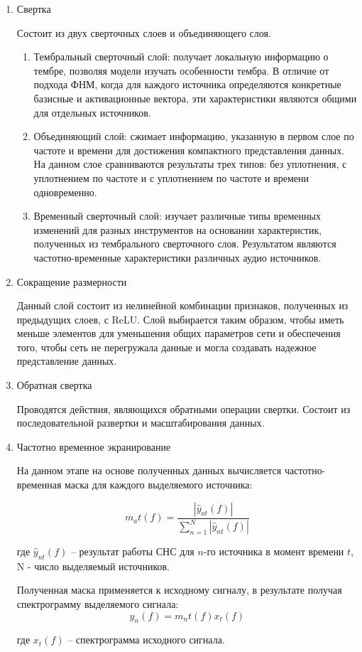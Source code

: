 \begin{enumerate}
	\item Свертка
	
	Состоит из двух сверточных слоев и объединяющего слоя. 
	\begin{enumerate}
		\item Тембральный сверточный слой: получает локальную информацию о тембре, позволяя модели изучать особенности тембра. В отличие от подхода ФНМ, когда для каждого источника определяются конкретные базисные и активационные вектора, эти характеристики являются общими для отдельных источников.
		\item Объединяющий слой: сжимает информацию, указанную в первом слое по частоте и времени для достижения компактного представления данных. На данном слое сравниваются результаты трех типов: без уплотнения, с уплотнением по частоте и с уплотнением по частоте и времени одновременно.
		\item Временный сверточный слой: изучает различные типы временных изменений для разных инструментов на основании характеристик, полученных из тембрального сверточного слоя. Результатом являются частотно-временные характеристики различных аудио источников. 
	\end{enumerate}
	
	\item Сокращение размерности
	
	Данный слой состоит из нелинейной комбинации признаков, полученных из предыдущих слоев, с ReLU. Слой выбирается таким образом, чтобы иметь меньше элементов для уменьшения общих параметров сети и обеспечения того, чтобы сеть не перегружала данные и могла создавать надежное представление данных.
	
	\item Обратная свертка
	
	Проводятся действия, являющихся обратными операции свертки. Состоит из последовательной развертки и масштабирования данных.
	
	\item Частотно временное экранирование
	
	На данном этапе на основе полученных данных вычисляется частотно-временная маска для каждого выделяемого источника:
	
	\begin{equation}
	m_a t (f) = \frac{|\hat{y}_{at}(f)|}{\sum_{n=1}^{N} |\hat{y}_{nt}(f)|}
	\end{equation}
	
	где $\hat{y}_{nt}(f)$ -- результат работы СНС для $n$-го источника в момент времени $t$, N - число выделяемый источников.
	
	Полученная маска применяется к исходному сигналу, в результате получая спектрограмму выделяемого сигнала:
	\begin{equation}
	y_n(f) = m_n t(f)x_t(f)
	\end{equation}
	
	где $x_t(f)$ -- спектрограмма исходного сигнала.
	
\end{enumerate}

